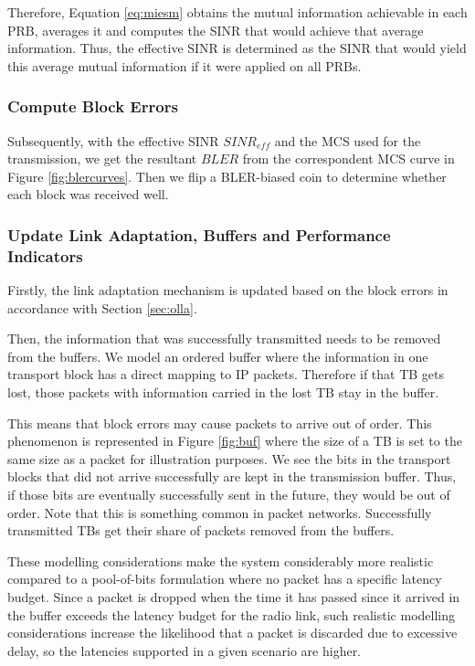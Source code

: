 Therefore, Equation \eqref{eq:miesm} obtains the mutual information achievable in each PRB, averages it and computes the SINR that would achieve that average information. Thus, the effective SINR is determined as the SINR that would yield this average mutual information if it were applied on all PRBs. 

\subsubsection*{Compute Block Errors}

Subsequently, with the effective SINR $SINR_{eff}$ and the MCS used for the transmission, we get the resultant $BLER$ from the correspondent MCS curve in Figure \ref{fig:blercurves}. Then we flip a \acs{BLER}-biased coin to determine whether each block was received well.


\subsubsection*{Update Link Adaptation, Buffers and Performance Indicators}

Firstly, the link adaptation mechanism is updated based on the block errors in accordance with Section \ref{sec:olla}. 

Then, the information that was successfully transmitted needs to be removed from the buffers. We model an ordered buffer where the information in one transport block has a direct mapping to IP packets. Therefore if that TB gets lost, those packets with information carried in the lost TB stay in the buffer.

This means that block errors may cause packets to arrive out of order. This phenomenon is represented in Figure \ref{fig:buf} where the size of a TB is set to the same size as a packet for illustration purposes. We see the bits in the transport blocks that did not arrive successfully are kept in the transmission buffer. Thus, if those bits are eventually successfully sent in the future, they would be out of order. Note that this is something common in packet networks. Successfully transmitted TBs get their share of packets removed from the buffers.



These modelling considerations make the system considerably more realistic compared to a pool-of-bits formulation where no packet has a specific latency budget. Since a packet is dropped when the time it has passed since it arrived in the buffer exceeds the latency budget for the radio link, such realistic modelling considerations increase the likelihood that a packet is discarded due to excessive delay, so the latencies supported in a given scenario are higher.

